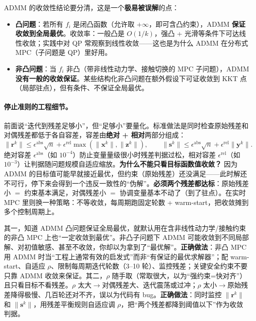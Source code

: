 ADMM 的收敛性结论要分清，这是一个\textbf{极易被误解}的点：
\begin{itemize}
  \item \textbf{凸问题}：若所有 $f_i$ 是闭凸函数（允许取 $+\infty$，即可含凸约束），ADMM \textbf{保证收敛到全局最优}。收敛率：一般凸是 $O(1/k)$，强凸 + 光滑等条件下可达线性收敛；实践中对 QP 常观察到线性收敛——这也是为什么 ADMM 在分布式 MPC（子问题是 QP）里好用。
  \item \textbf{非凸问题}：当 $f_i$ 非凸（带非线性动力学、接触切换的 MPC 子问题），ADMM \textbf{没有一般的收敛保证}。某些结构化非凸问题在额外假设下可证收敛到 KKT 点（局部驻点），但有条件、不保证全局最优。
\end{itemize}

\paragraph{停止准则的工程细节。}
前面说“迭代到残差足够小”，但“足够小”要量化。标准做法是同时检查原始残差和对偶残差都低于各自容差，容差由\textbf{绝对 + 相对}两部分组成：
\begin{equation}
  \|\mathbf{r}^k\|\le\epsilon^{\text{abs}}\sqrt{n}+\epsilon^{\text{rel}}\max(\|\mathbf{x}^k\|,\|\mathbf{z}^k\|),\qquad \|\mathbf{s}^k\|\le\epsilon^{\text{abs}}\sqrt{n}+\epsilon^{\text{rel}}\|\mathbf{y}^k\|.
  \label{eq:cs-stopping}
\end{equation}
绝对容差 $\epsilon^{\text{abs}}$（如 $10^{-4}$）防止变量量级很小时残差判据过松，相对容差 $\epsilon^{\text{rel}}$（如 $10^{-3}$）让判据随问题规模自适应缩放。\textbf{为什么不能只看目标函数值收敛？} 因为 ADMM 的目标值可能早就接近最优，但约束（原始残差）还没满足——此时解还不可行，停下来会得到一个违反一致性的“伪解”。\textbf{必须两个残差都达标}：原始残差小 $=$ 约束基本满足，对偶残差小 $=$ 协调变量基本不动了（到了驻点）。在实时 MPC 里则换一种策略：不等收敛，每周期跑固定轮数 + warm-start，把收敛摊到多个控制周期上。

\begin{pitfall}
其一，知道 ADMM 凸问题保证全局最优，就默认用在含非线性动力学/接触约束的非凸 MPC 上也“一定收敛到最优”。非凸子问题下 ADMM 可能收敛到不同局部解、对初值敏感、甚至不收敛，你却以为拿到了“最优解”。\textbf{正确做法}：非凸 MPC 用 ADMM 时当“工程上通常有效的启发式”而非“有保证的最优求解器”；配 warm-start、自适应 $\rho$、限制每周期迭代轮数（3--10 轮）、监控残差；关键安全约束不要只靠 ADMM 收敛来保证。其二，$\rho$ 随手取（常取很大，以为“强约束=快对齐”）且只看目标不看残差。$\rho$ 太大$\to$对偶残差大、迭代震荡或过冲；$\rho$ 太小$\to$原始残差降得极慢、几百轮还对不齐，误以为代码有 bug。\textbf{正确做法}：同时监控 $\|\mathbf{r}^k\|$ 和 $\|\mathbf{s}^k\|$，用残差平衡规则自适应调 $\rho$，把“两个残差都降到阈值以下”作为收敛判据。
\end{pitfall}

